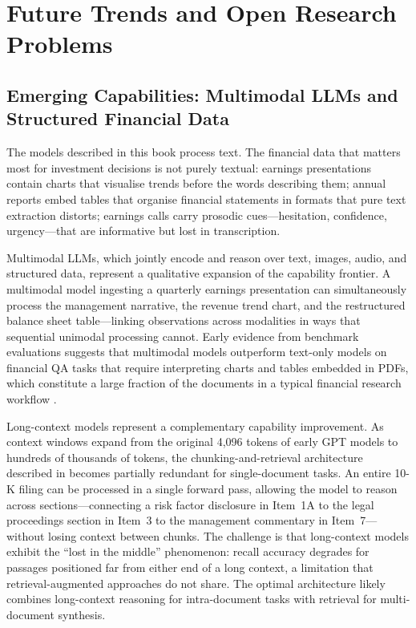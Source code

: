 
\section{Future Trends and Open Research Problems}
\label{sec:af-future}

\begin{context}

\subsection{Emerging Capabilities: Multimodal LLMs and Structured Financial Data}
\label{subsec:af-future-multimodal}

The models described in this book process text. The financial data that matters most for investment decisions is not purely textual: earnings presentations contain charts that visualise trends before the words describing them; annual reports embed tables that organise financial statements in formats that pure text extraction distorts; earnings calls carry prosodic cues---hesitation, confidence, urgency---that are informative but lost in transcription.

Multimodal LLMs, which jointly encode and reason over text, images, audio, and structured data, represent a qualitative expansion of the capability frontier. A multimodal model ingesting a quarterly earnings presentation can simultaneously process the management narrative, the revenue trend chart, and the restructured balance sheet table---linking observations across modalities in ways that sequential unimodal processing cannot. Early evidence from benchmark evaluations suggests that multimodal models outperform text-only models on financial QA tasks that require interpreting charts and tables embedded in PDFs, which constitute a large fraction of the documents in a typical financial research workflow \cite{zhang2024financebench}.

Long-context models represent a complementary capability improvement. As context windows expand from the original 4,096 tokens of early GPT models to hundreds of thousands of tokens, the chunking-and-retrieval architecture described in  becomes partially redundant for single-document tasks. An entire 10-K filing can be processed in a single forward pass, allowing the model to reason across sections---connecting a risk factor disclosure in Item~1A to the legal proceedings section in Item~3 to the management commentary in Item~7---without losing context between chunks. The challenge is that long-context models exhibit the ``lost in the middle'' phenomenon: recall accuracy degrades for passages positioned far from either end of a long context, a limitation that retrieval-augmented approaches do not share. The optimal architecture likely combines long-context reasoning for intra-document tasks with retrieval for multi-document synthesis.


\end{context}
